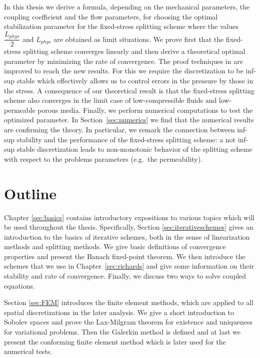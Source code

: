 \documentclass[../Main/main.tex]{subfiles}
\begin{document}
In this thesis we derive a formula, depending on the mechanical parameters, the coupling coefficient and the flow parameters, for choosing the optimal stabilization parameter for the fixed-stress splitting scheme where the values  $\dfrac{L_{phys}} {2}$ and $L_{phys}$ are obtained as limit situations. We prove first that the fixed-stress splitting scheme converges linearly and then derive a theoretical optimal parameter by minimizing the rate of convergence. 
The proof techniques in \cite{jakubAML} are improved to reach the new results. For this we require the discretization to be inf-sup stable which effectively allows us to control errors in the pressure by those in the stress. A consequence of our theoretical result is that the fixed-stress splitting scheme also converges in the limit case of low-compressible fluids and low-permeable porous media. Finally, we perform numerical computations to test the optimized parameter. In Section~\ref{sec:numerics} we find that the numerical results are confirming the theory. In particular, we remark the connection between inf-sup stability and the performance of the fixed-stress splitting scheme: a not inf-sup stable discretization leads to non-monotonic behavior of the splitting scheme with respect to the problems parameters (e.g.\ the permeability).

\section*{Outline}
Chapter \ref{sec:basics} contains introductory expositions to various topics which will be used throughout the thesis. Specifically, Section \ref{sec:iterativeschemes} gives an introduction to the basics of iterative schemes, both in the sense of linearization methods and splitting methods. We give basic definitions of convergence properties and present the Banach fixed-point theorem. We then introduce the schemes that we use in Chapter~\ref{sec:richards} and give some information on their stability and rate of convergence. Finally, we discuss two ways to solve coupled equations. 

Section \ref{sec:FEM} introduces the finite element methods, which are applied to all spatial discretizations in the later analysis.  We give a short introduction to Sobolev spaces and prove the Lax-Milgram theorem for existence and uniqueness for variational problems. Then the Galerkin method is defined and at last we present the conforming finite element method which is later used for the numerical tests.
\end{document}
